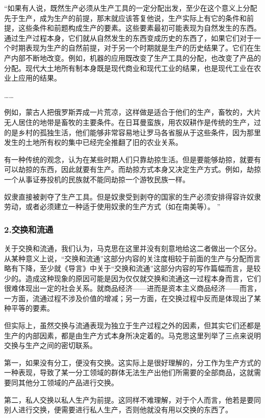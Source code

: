 \documentclass[a4paper,twoside,12pt,AutoFakeBold]{ctexart}
\begin{document}
\begin{adjustwidth}{2em}{2em}
    \qquad\fangsong
    “如果有人说，既然生产必须从生产工具的一定分配出发，至少在这个意义上分配先于生产，成为生产的前提，那末就应该答复他说，生产实际上有它的条件和前提，这些条件和前题构成生产的要素。这些要素最初可能表现为自然发生的东西。通过生产过程本身，它们就从自然发生的东西变成历史的东西了，如果它们对于一个时期表现为生产的自然前提，对于另一个时期就是生产的历史结果了。它们在生产内部不断地改变。例如，机器的应用既改变了生产工具的分配，也改变了产品的分配。现代大土地所有制本身既是现代商业和现代工业的结果，也是现代工业在农业上应用的结果。
    
    ……
    
    例如，蒙古人把俄罗斯弄成一片荒凉，这样做是适合于他们的生产，畜牧的，大片无人居住的地带是畜牧的主要条件。在日耳曼蛮族，用农奴耕作是传统的生产，过的是乡村的孤独生活，他们能够非常容易地让罗马各省服从于这些条件，因为那里发生的土地所有权的集中已经完全推翻了旧的农业关系。

有一种传统的观念，认为在某些时期人们只靠劫掠生活。但是要能够劫掠，就要有可以劫掠的东西，因此就要有生产。而劫掠方式本身又决定生产方式。例如，劫掠一个从事证券投机的民族就不能同劫掠一个游牧民族一样。

奴隶直接被剥夺了生产工具。但是奴隶受到剥夺的国家的生产必须安排得容许奴隶劳动，或者必须建立一种适于使用奴隶的生产方式（如在南美等）。
”
\end{adjustwidth}

\subsubsection{2.交换和流通}
关于交换和流通，我们认为，马克思在这里并没有刻意地给这二者做出一个区分。从某种意义上说，“交换和流通”这部分内容的关注度相较于前面的生产与分配而言略有下降，至少就《导言》中关于“交换和流通”这部分内容的写作篇幅而言，是较少的。造成这种现象的原因可能是因为仅仅就交换和流通这一过程本身而言，它们很难体现出一定的社会关系。就商品经济——进而是资本主义商品经济——而言，一方面，流通过程不涉及价值的增减；另一方面，在交换过程中反而是体现出了某种平等的要素。

但实际上，虽然交换与流通表现为独立于生产过程之外的因素，但其实它们还都是生产的内部因素，都是由生产方式本身所决定着的。马克思这里列举了三点来说明交换与生产之间的密切联系。

第一，如果没有分工，便没有交换。这实际上是很好理解的，分工作为生产方式的一种表现，导致了某一分工领域的群体无法生产出他们所需要的全部商品，这就需要同其他分工领域的产品进行交换。

第二，私人交换以私人生产为前提。这同样不难理解，对于个人而言，他若是要同别人进行交换，便需要进行私人生产，否则他就没有用以交换的东西了。
\end{document}
